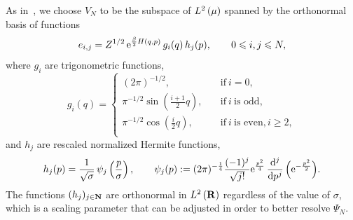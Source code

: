 \documentclass[11pt,a4paper]{article}
\begin{document}
As in~\cite{roussel2018spectral},
we choose $V_N$ to be the subspace of $\lp{2}{\mu}$ spanned by the orthonormal basis of functions
\begin{equation}
  \label{eq:basis_functions}
  e_{i,j} = Z^{1/2} \, \mathrm{e}^{\frac{\beta}{2} H(q,p)}
  \, g_i(q) \, h_j(p), \qquad 0 \leqslant i,j \leqslant N,
\end{equation}
where $g_i$ are trigonometric functions,
\begin{equation}
  \label{eq:definition_trigonometric_functions}
  g_i(q) =
  \left\{ \begin{aligned}
    (2 \pi)^{-1/2}, \quad & \text{if}~i = 0, \\
    \pi^{-1/2} \sin\left(\frac{i + 1}{2}q\right), \quad & \text{if}~i~\text{is odd}, \\
    \pi^{-1/2} \cos\left(\frac{i}{2}q\right), \quad & \text{if}~i~\text{is even}, i \geq 2, \\
  \end{aligned} \right.
\end{equation}
and $h_j$ are rescaled normalized Hermite functions,
\begin{equation}
  \label{eq:definition_hermite_functions}
  h_j(p) = \frac{1}{\sqrt{\sigma}} \, \psi_j \left( \frac{p}{\sigma} \right),
  \qquad \psi_j (p) := (2 \pi)^{-\frac{1}{4}} \frac{(-1)^j}{\sqrt{j!}} \e^{\frac{p^2}{4}} \, \derivative*{j}{p^j} \, \Bigl( \e^{- \frac{p^2}{2}} \Bigr).
\end{equation}
The functions $(h_j)_{j\in \mathbf N}$ are orthonormal in $\lp{2}{\real}$ regardless of the value of $\sigma$,
which is a scaling parameter that can be adjusted in order to better resolve $\Psi_N$.
\end{document}
